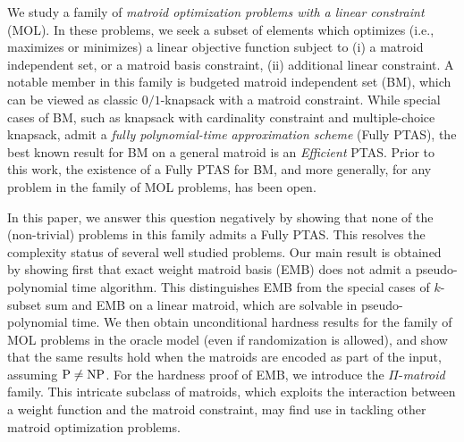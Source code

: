
We study a family of {\em matroid optimization problems with a linear constraint} (MOL). 
In these problems, we seek a subset of elements which optimizes (i.e., maximizes or minimizes) a linear objective function subject to (i) a matroid independent set, or a matroid basis constraint, (ii) additional linear constraint. A notable 
member in this family is {\sc budgeted matroid independent set (BM)}, which  can be viewed as classic $0/1${\sc-knapsack} with a matroid constraint. While special cases of BM, such as  {\sc knapsack with cardinality constraint} and {\sc multiple-choice knapsack}, admit a {\em fully polynomial-time approximation scheme} (Fully PTAS), the best known result for BM on a general matroid is an {\em Efficient} PTAS. Prior to this work, the existence of a Fully PTAS for BM, and more generally, for any problem in the  family of MOL problems, 
has been open.

In this paper, we answer this question negatively by showing that none of the (non-trivial) problems in this family admits a Fully PTAS. This resolves the complexity status of several well studied problems. Our main result is obtained by showing first that {\sc exact weight matroid basis (EMB)} does not admit a pseudo-polynomial time algorithm. This distinguishes EMB from the special cases of $k$-{\sc subset sum} and EMB on a linear matroid, which are solvable in pseudo-polynomial time.
We then obtain unconditional hardness results for the family of MOL 
problems in the oracle model (even if randomization is allowed), and show that the same results hold when the matroids are encoded as part of the input, assuming $\textnormal{P} \neq \textnormal{NP}$. For the hardness proof of EMB, we introduce the $\Pi$-{\em matroid} family. This intricate subclass of matroids, which exploits the interaction 
between a weight function and the matroid constraint, may find use in tackling other matroid optimization problems.

